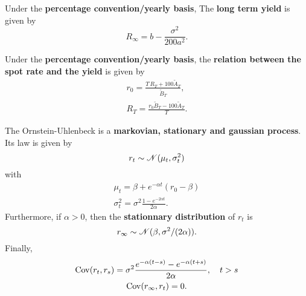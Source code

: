 \documentclass[10pt]{article}
\begin{document}
\begin{outline}
  \1 Under the \textbf{percentage convention/yearly basis}, The \textbf{long term yield}
  is given by
  \begin{equation*}
    R_\infty = b - \frac{\sigma^2}{200a^2}.
  \end{equation*}

  \1 Under the \textbf{percentage convention/yearly basis}, the \textbf{relation between
    the spot rate and the yield} is given by
  \begin{gather*}
    r_0 = \frac{T\,R_T + 100 \tilde A_T}{\tilde B_T},\\
    R_T = \frac{r_0\tilde B_T - 100\tilde A_T}{T}.
  \end{gather*}
  
  \1 The Ornstein-Uhlenbeck is a \textbf{markovian, stationary and gaussian process}. Its
  law is given by
  \begin{equation*}
    r_t \sim \mathscr{N}(\mu_t,\sigma^2_t)
  \end{equation*}
  with
  \begin{gather*}
    \mu_t = \beta + e^{-\alpha t}(r_0 - \beta)\\
    \sigma^2_t = \sigma^2\frac{1-e^{-2\alpha t}}{2\alpha}.
  \end{gather*}
  Furthermore, if $\alpha>0$, then the \textbf{stationnary distribution} of $r_t$ is
  \begin{equation*}
    r_\infty \sim \mathscr{N}(\beta,\sigma^2/(2\alpha)).
  \end{equation*}
  Finally, 
  \begin{gather*}
    \operatorname{Cov}(r_t,r_s) = \sigma^2\frac{e^{-\alpha(t-s)}-e^{-\alpha(t+s)}}{2\alpha},\quad t>s\\
    \operatorname{Cov}(r_\infty,r_t) = 0.
  \end{gather*}
\end{outline}
\end{document}
